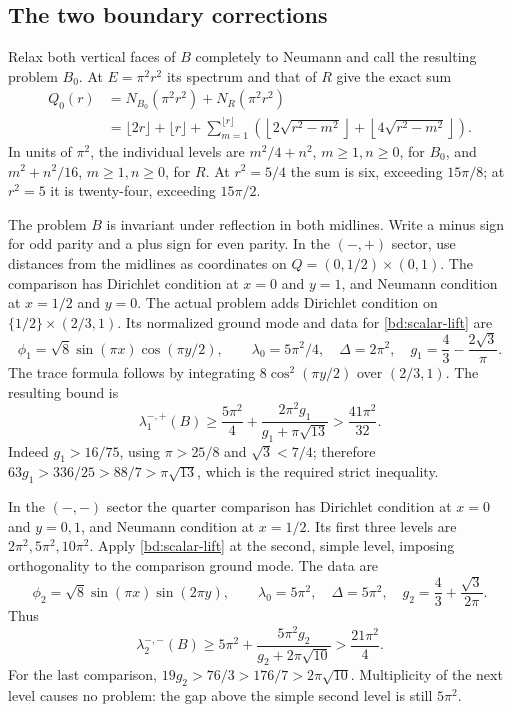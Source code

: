 \documentclass[11pt,reqno]{amsart}
\numberwithin{equation}{section}
\begin{document}
\subsection{The two boundary corrections}

Relax both vertical faces of $B$ completely to Neumann and call
the resulting problem $B_0$. At $E=\pi^2r^2$ its spectrum and
that of $R$ give the exact sum
\begin{equation}\label{ch:coarse}
 \begin{split}
 Q_0(r)&=N_{B_0}(\pi^2r^2)+N_R(\pi^2r^2)\\
 &=\lfloor2r\rfloor+\lfloor r\rfloor
 +\sum_{m=1}^{\lfloor r\rfloor}
 \left(\left\lfloor2\sqrt{r^2-m^2}\right\rfloor
       +\left\lfloor4\sqrt{r^2-m^2}\right\rfloor\right).
 \end{split}
\end{equation}
In units of $\pi^2$, the individual levels are
$m^2/4+n^2$, $m\ge1,n\ge0$, for $B_0$, and
$m^2+n^2/16$, $m\ge1,n\ge0$, for $R$.
At $r^2=5/4$ the sum is six, exceeding $15\pi/8$;
at $r^2=5$ it is twenty-four, exceeding $15\pi/2$.

The problem $B$ is invariant under reflection in both midlines.
Write a minus sign for odd parity and a plus sign for even parity.
In the $(-,+)$ sector, use distances from the midlines as
coordinates on $Q=(0,1/2)\times(0,1)$. The comparison has
Dirichlet condition at $x=0$ and $y=1$, and Neumann condition
at $x=1/2$ and $y=0$. The actual problem adds Dirichlet
condition on $\{1/2\}\times(2/3,1)$. Its normalized ground
mode and data for \eqref{bd:scalar-lift} are
\[
 \phi_1=\sqrt8\sin(\pi x)\cos(\pi y/2),\qquad
 \lambda_0=5\pi^2/4,\quad \Delta=2\pi^2,\quad
 g_1=\frac43-\frac{2\sqrt3}{\pi}.
\]
The trace formula follows by integrating $8\cos^2(\pi y/2)$
over $(2/3,1)$. The resulting bound is
\begin{equation}\label{ch:first-lift}
 \lambda_1^{-,+}(B)
 \ge\frac{5\pi^2}{4}
   +\frac{2\pi^2g_1}{g_1+\pi\sqrt{13}}
 >\frac{41\pi^2}{32}.
\end{equation}
Indeed $g_1>16/75$, using $\pi>25/8$ and $\sqrt3<7/4$;
therefore $63g_1>336/25>88/7>\pi\sqrt{13}$, which is
the required strict inequality.

In the $(-,-)$ sector the quarter comparison has Dirichlet
condition at $x=0$ and $y=0,1$, and Neumann condition at
$x=1/2$. Its first three levels are $2\pi^2,5\pi^2,10\pi^2$.
Apply \eqref{bd:scalar-lift} at the second, simple level,
imposing orthogonality to the comparison ground mode. The data are
\[
 \phi_2=\sqrt8\sin(\pi x)\sin(2\pi y),\qquad
 \lambda_0=5\pi^2,\quad\Delta=5\pi^2,\quad
 g_2=\frac43+\frac{\sqrt3}{2\pi}.
\]
Thus
\begin{equation}\label{ch:second-lift}
 \lambda_2^{-,-}(B)
 \ge5\pi^2+\frac{5\pi^2g_2}{g_2+2\pi\sqrt{10}}
 >\frac{21\pi^2}{4}.
\end{equation}
For the last comparison, $19g_2>76/3>176/7>
2\pi\sqrt{10}$. Multiplicity of the next level causes no
problem: the gap above the simple second level is still $5\pi^2$.
\end{document}
